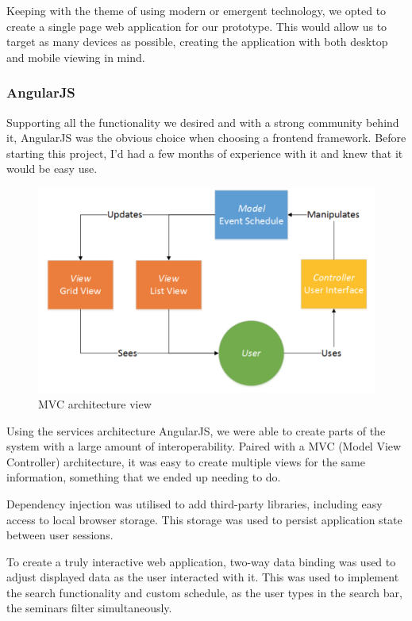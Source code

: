 \documentclass[conference]{IEEEtran}
\begin{document}
Keeping with the theme of using modern or emergent technology, we opted to create a single page web application for our prototype. This would allow us to target as many devices as possible, creating the application with both desktop and mobile viewing in mind.

\subsubsection{AngularJS}
Supporting all the functionality we desired and with a strong community behind it, AngularJS was the obvious choice when choosing a frontend framework. Before starting this project, I'd had a few months of experience with it and knew that it would be easy use.

\begin{figure}[h]
  \centering
  \includegraphics[scale=0.28]{images/arch_1.png}
  \caption{MVC architecture view}
  \label{fig:arch_1}
\end{figure}

Using the services architecture AngularJS, we were able to create parts of the system with a large amount of interoperability. Paired with a MVC (Model View Controller) architecture, it was easy to create multiple views for the same information, something that we ended up needing to do.

Dependency injection was utilised to add third-party libraries, including easy access to local browser storage. This storage was used to persist application state between user sessions.

To create a truly interactive web application, two-way data binding was used to adjust displayed data as the user interacted with it. This was used to implement the search functionality and custom schedule, as the user types in the search bar, the seminars filter simultaneously.
\end{document}
